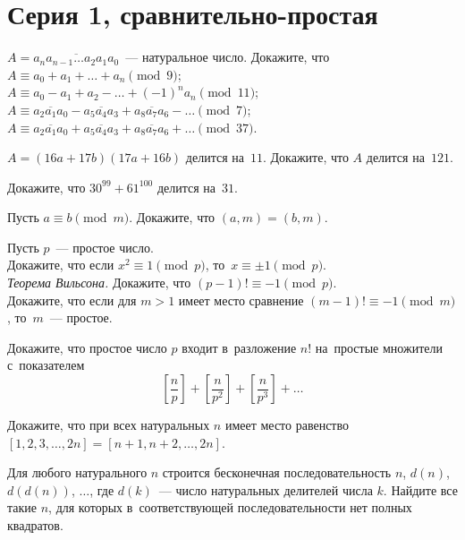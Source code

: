 

\section*{Серия 1, сравнительно-простая}


\begin{problems}

\item
$A = \overline{a_n a_{n-1} \ldots a_2 a_1 a_0}$~--- натуральное число.
Докажите, что
\\
\sbp $A \equiv a_0 + a_1 + \ldots + a_n \pmod{9}$;
\\
\sbp $A \equiv a_0 - a_1 + a_2 - \ldots + (-1)^n a_n \pmod{11}$;
\\
\sbp
\(
    A
\equiv
    \overline{a_2 a_1 a_0} - \overline{a_5 a_4 a_3} +
    \overline{a_8 a_7 a_6} - \ldots
    \pmod{7}
\);
\\
\sbp
\(
    A
\equiv
    \overline{a_2 a_1 a_0} + \overline{a_5 a_4 a_3} +
    \overline{a_8 a_7 a_6} + \ldots
    \pmod{37}
\).

\item
$A = (16 a + 17 b) (17 a + 16 b)$ делится на~$11$.
Докажите, что $A$ делится на~$121$.

\item
Докажите, что $30^{99} + 61^{100}$ делится на~$31$.

\item
Пусть $a \equiv b \pmod m$.
Докажите, что $(a, m) = (b, m)$.

\item
Пусть $p$~--- простое число.
\\
\sbp Докажите, что если $x^2 \equiv 1 \pmod{p}$, то~$x \equiv \pm 1 \pmod{p}$.
\\
\sbp\emph{Теорема Вильсона.}
Докажите, что $(p - 1)! \equiv -1 \pmod{p}$.
\\
\sbp
Докажите, что если для $m > 1$ имеет место сравнение
$(m - 1)! \equiv -1 \pmod{m}$, то~$m$~--- простое.
\medskip

\item
Докажите, что простое число $p$ входит в~разложение $n!$ на~простые множители
с~показателем
\[
    \left[  \frac{n}{p}  \right] +
    \left[ \frac{n}{p^2} \right] +
    \left[ \frac{n}{p^3} \right] + \ldots
\]

\item
Докажите, что при всех натуральных $n$ имеет место равенство
$[1, 2, 3, \dots, 2n] = [n+1, n+2, \dots, 2n]$.

\item
Для любого натурального $n$ строится бесконечная последовательность
$n$, $d(n)$, $d(d(n))$, $\ldots$, где $d(k)$~--- число натуральных делителей
числа $k$.
Найдите все такие $n$, для которых в~соответствующей последовательности нет
полных квадратов.

\end{problems}

